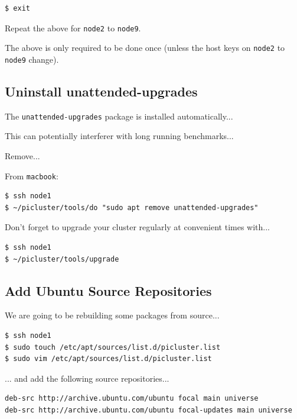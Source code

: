 \documentclass{report}
\begin{document}
\lstset{style=type}
\begin{lstlisting}[]
$ exit
\end{lstlisting}

Repeat the above for \verb|node2| to \verb|node9|.

The above is only required to be done once (unless the host keys on \verb|node2| to \verb|node9| change).


%
%

\subsection{Uninstall unattended-upgrades}

The \verb|unattended-upgrades| package is installed automatically...

This can potentially interferer with long running benchmarks...

Remove...

From \verb|macbook|:

\lstset{style=type}
\begin{lstlisting}[]
$ ssh node1
$ ~/picluster/tools/do "sudo apt remove unattended-upgrades"
\end{lstlisting}

Don't forget to upgrade your cluster regularly at convenient times with...

\lstset{style=type}
\begin{lstlisting}[]
$ ssh node1
$ ~/picluster/tools/upgrade
\end{lstlisting}


\subsection{Add Ubuntu Source Repositories}

We are going to be rebuilding some packages from source...

\lstset{style=type}
\begin{lstlisting}[]
$ ssh node1
$ sudo touch /etc/apt/sources/list.d/picluster.list
$ sudo vim /etc/apt/sources/list.d/picluster.list
\end{lstlisting}

... and add the following source repositories...

\lstset{style=listing}
\begin{lstlisting}[caption=/etc/apt/sources.list.d/picluster.list]
deb-src http://archive.ubuntu.com/ubuntu focal main universe
deb-src http://archive.ubuntu.com/ubuntu focal-updates main universe
\end{lstlisting}
\end{document}
